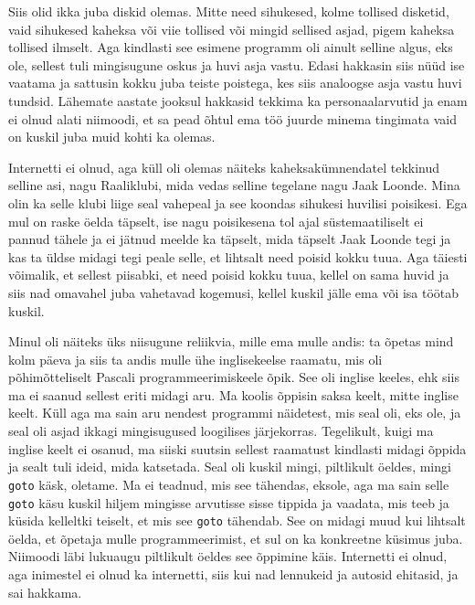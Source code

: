 
Siis olid ikka juba diskid olemas. Mitte need sihukesed, kolme tollised 
disketid, vaid sihukesed  kaheksa või viie tollised või mingid sellised asjad, 
pigem kaheksa tollised ilmselt. Aga kindlasti see esimene programm oli ainult 
selline algus, eks ole, sellest tuli mingisugune  oskus ja huvi asja vastu. 
Edasi hakkasin siis nüüd ise vaatama ja  sattusin kokku juba teiste poistega, 
kes siis analoogse asja vastu huvi tundsid. Lähemate aastate jooksul hakkasid 
tekkima ka personaalarvutid ja enam ei olnud alati niimoodi, et sa pead õhtul 
ema töö juurde minema tingimata vaid on kuskil juba muid kohti ka olemas.


Internetti ei olnud, aga küll oli olemas näiteks kaheksakümnendatel tekkinud 
selline asi, nagu Raaliklubi, mida vedas selline tegelane 
nagu Jaak Loonde. Mina olin ka selle klubi liige seal 
vahepeal ja see koondas sihukesi huvilisi poisikesi. Ega mul on raske öelda 
täpselt,  ise nagu poisikesena tol ajal süstemaatiliselt ei pannud tähele ja ei 
jätnud meelde ka täpselt, mida täpselt Jaak Loonde tegi ja kas ta üldse midagi 
tegi peale selle, et lihtsalt need poisid kokku tuua. Aga täiesti võimalik, et 
sellest piisabki, et need poisid kokku tuua, kellel on sama huvid ja siis nad 
omavahel juba vahetavad kogemusi, kellel kuskil jälle ema või isa töötab 
kuskil. 

Minul oli näiteks üks niisugune reliikvia, mille ema mulle andis: ta õpetas 
mind kolm päeva ja siis ta andis mulle ühe inglisekeelse raamatu, mis oli 
põhimõtteliselt Pascali programmeerimiskeele õpik. See oli inglise keeles, ehk 
siis ma ei saanud sellest eriti midagi aru. Ma koolis õppisin saksa keelt, 
mitte inglise keelt. Küll aga ma sain aru 
nendest  programmi näidetest, mis seal oli, eks ole, ja seal oli asjad ikkagi 
mingisugused loogilises  järjekorras. Tegelikult, kuigi ma inglise keelt ei 
osanud, ma siiski suutsin sellest raamatust kindlasti midagi õppida ja sealt 
tuli ideid, mida katsetada. Seal oli kuskil mingi, piltlikult öeldes, mingi 
\verb|goto| käsk, oletame. Ma ei teadnud, mis see tähendas, eksole, aga ma sain 
selle \verb|goto| käsu kuskil hiljem mingisse arvutisse sisse tippida ja 
vaadata, mis teeb ja küsida kelleltki teiselt, et mis see \verb|goto| tähendab. 
See on midagi muud kui lihtsalt öelda, et õpetaja mulle programmeerimist, et 
sul on ka konkreetne küsimus juba. Niimoodi läbi lukuaugu piltlikult öeldes see 
õppimine käis. Internetti ei olnud, aga  inimestel ei olnud ka internetti, siis 
kui nad  lennukeid ja autosid ehitasid, ja sai hakkama.

